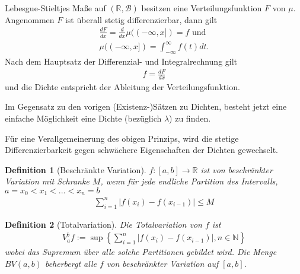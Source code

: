 \documentclass[]{article}
\newtheorem{definition}{Definition}
\begin{document}
Lebesgue-Stieltjes Maße auf $(\mathbb{R}, \mathcal{B})$ besitzen eine Verteilungsfunktion $F$ von $\mu$. Angenommen $F$ ist überall stetig differenzierbar, dann gilt
\begin{align*}
	\frac{dF}{dx} = \frac{d}{dx} \mu((-\infty,x]) = f \text{ und}\\
	\mu((-\infty,x]) = \int_{-\infty}^{\infty} f(t) dt.
\end{align*}
Nach dem Hauptsatz der Differenzial- und Integralrechnung gilt
\begin{align*}
	f = \frac{dF}{dx}
\end{align*}
und die Dichte entspricht der Ableitung der Verteilungsfunktion.

Im Gegensatz zu den vorigen (Existenz-)Sätzen zu Dichten, besteht jetzt eine einfache Möglichkeit eine Dichte (bezüglich $\lambda$) zu finden.

Für eine Verallgemeinerung des obigen Prinzips, wird die stetige Differenzierbarkeit gegen schwächere Eigenschaften der Dichten gewechselt.

\begin{definition}[Beschränkte Variation]
	$f:[a,b]\rightarrow \mathbb{R}$ ist von beschränkter Variation mit Schranke $M$, wenn für jede endliche Partition des Intervalls, $a=x_0<x_1<...<x_n=b$
	\begin{align*}
		\sum_{i=1}^{n} |f(x_i) - f(x_{i-1}) | \leq M
	\end{align*}
\end{definition}
\begin{definition}[Totalvariation]
	Die Totalvariation von $f$ ist
	\begin{align*}
		V_a^b f := \sup \left\{ \sum_{i=1}^{n} |f(x_i) - f(x_{i-1}) |, n \in \mathbb{N} \right\}
	\end{align*}
	wobei das Supremum über alle solche Partitionen gebildet wird. Die Menge $BV(a,b)$ beherbergt alle $f$ von beschränkter Variation auf $[a,b]$.
\end{definition}
\end{document}
